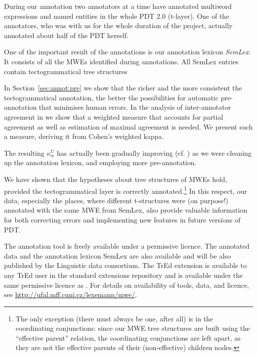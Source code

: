 During our annotation two annotators at a time have annotated multiword expressions and named entities in the whole PDT 2.0 (t-layer). One of the annotators, who was with us for the whole duration of the project, actually annotated about half of the PDT herself.

One of the important result of the annotations is our annotation lexicon \emph{SemLex}: It consists of all the MWEs identified during annotations. All SemLex entries contain tectogrammatical tree structures 

In Section~\ref{sec:annot:pre} we show that the richer and the more consistent the tectogrammatical annotation, the better the possibilities for automatic pre-annotation that minimises human errors. In the analysis of inter-annotator agreement in  we show that a weighted measure that accounts for partial agreement as well as estimation of maximal agreement is needed. We present such a measure, deriving it from Cohen's weighted kappa.

The resulting $\kappa_w^U$ has actually been gradually improving (cf. \citealp{biblio:BeStAnnotationMultiword2008}) as we were cleaning up the annotation lexicon, and employing more pre-annotation.


We have shown that the hypotheses about tree structures of MWEs hold, provided the tectogrammatical layer is correctly annotated.\footnote{The only exception (there must always be one, after all) is in the coordinating conjunctions: since our MWE tree structures are built using the ``effective parent'' relation, the coordinating conjunctions are left apart, as they are not the effective parents of their (non-effective) children nodes.} In this respect, our data, especially the places, where different t-structures were (on purpose!) annotated with the same MWE from SemLex, also provide valuable information for both correcting errors and implementing new features in future versions of PDT. 

The annotation tool  is freely available under a permissive licence. The annotated data and the annotation lexicon SemLex are also available and will be also published by the Linguistic data consortium. The TrEd extension is available to any TrEd user in the standard extensions repository and is available under the same permissive licence as . For details on availability of tools, data, and licence, see \url{http://ufal.mff.cuni.cz/lexemann/mwe/}.


